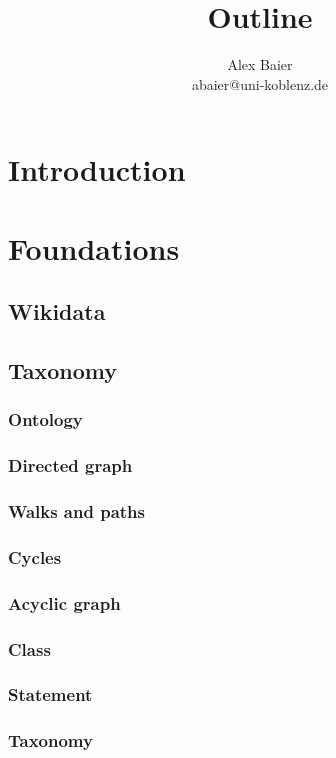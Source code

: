 \documentclass[11pt]{scrartcl} %
\title{Outline}
\author{Alex Baier \\ abaier@uni-koblenz.de}
\theoremstyle{definition}
\begin{document}
\maketitle

\tableofcontents

\section{Introduction}

\section{Foundations}

\subsection{Wikidata}

\subsection{Taxonomy}

\subsubsection{Ontology}
\subsubsection{Directed graph}
\subsubsection{Walks and paths}
\subsubsection{Cycles}
\subsubsection{Acyclic graph}
\subsubsection{Class}
\subsubsection{Statement}
\subsubsection{Taxonomy}
\end{document}
